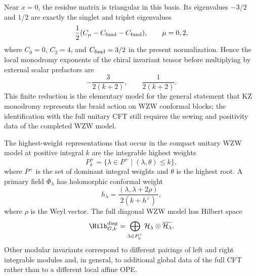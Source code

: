 Near \(x=0\), the residue matrix is triangular in this basis.  Its
eigenvalues \(-3/2\) and \(1/2\) are exactly the singlet and triplet
eigenvalues
\[
  \frac12(C_\mu-C_{\rm fund}-C_{\rm fund}),
  \qquad
  \mu=0,2,
\]
where \(C_0=0\), \(C_2=4\), and
\(C_{\rm fund}=3/2\) in the present normalization.  Hence the local
monodromy exponents of the chiral invariant tensor before multiplying by
external scalar prefactors are
\[
  -\frac{3}{2(k+2)},
  \qquad
  \frac{1}{2(k+2)}.
\]
This finite reduction is the elementary model for the general statement that
KZ monodromy represents the braid action on WZW conformal blocks; the
identification with the full unitary CFT still requires the sewing and
positivity data of the completed WZW model.

The highest-weight representations that occur in the compact unitary WZW
model at positive integral \(k\) are the integrable highest weights
\begin{equation}
  P_k^+
  =
  \{\lambda\in P^+\mid (\lambda,\theta)\le k\},
  \label{eq:wzw-integrable-highest-weights}
\end{equation}
where \(P^+\) is the set of dominant integral weights and \(\theta\) is the
highest root.  A primary field \(\Phi_\lambda\) has holomorphic conformal
weight
\begin{equation}
  h_\lambda
  =
  \frac{(\lambda,\lambda+2\rho)}
       {2(k+h^\vee)},
  \label{eq:wzw-primary-conformal-weight}
\end{equation}
where \(\rho\) is the Weyl vector.  The full diagonal WZW model has Hilbert
space
\begin{equation}
  \Hilb_{G,k}^{\mathrm{diag}}
  =
  \bigoplus_{\lambda\in P_k^+}
  \mathcal H_\lambda\otimes\overline{\mathcal H_\lambda}.
  \label{eq:wzw-diagonal-hilbert-space}
\end{equation}
Other modular invariants correspond to different pairings of left and right
integrable modules and, in general, to additional global data of the full
CFT rather than to a different local affine OPE.

